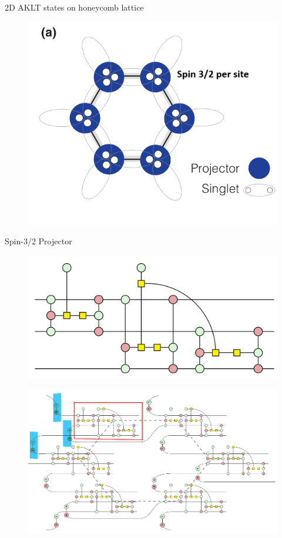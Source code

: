 \documentclass[aspectratio=169,xcolor=dvipsnames, t]{beamer}
\begin{document}

\begin{frame}{2D AKLT states on honeycomb lattice}

    \begin{figure}
        \includegraphics[width=.6\textwidth]{figures/two_dim_aklt_on_honeycomb.png}
    \end{figure}
\end{frame}

\begin{frame}{Spin-3/2 Projector}
    \begin{figure}
        \centering
        \includegraphics[width=.8\textwidth]{figures/spin_three_half_projector.png}
    \end{figure}
\end{frame}

\begin{frame}
    \begin{figure}
        \centering
        \includegraphics[width=.9\textwidth]{figures/zx_two_dim_aklt_on_honeycomb.png}
    \end{figure}
\end{frame}
\end{document}
